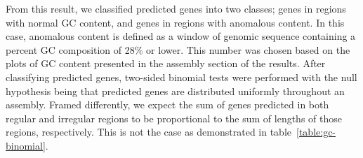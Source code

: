 

From this result, we classified predicted genes into two classes;
genes in regions with normal GC content, and genes in regions with
anomalous content. In this case, anomalous content is defined as a
window of genomic sequence containing a percent GC composition of 28\%
or lower. This number was chosen based on the plots of GC content
presented in the assembly section of the results. After classifying
predicted genes, two-sided binomial tests were performed with the null
hypothesis being that predicted genes are distributed uniformly
throughout an assembly. Framed differently, we expect the sum of genes
predicted in both regular and irregular regions to be proportional to
the sum of lengths of those regions, respectively. This is not the
case as demonstrated in table~\ref{table:gc-binomial}.

